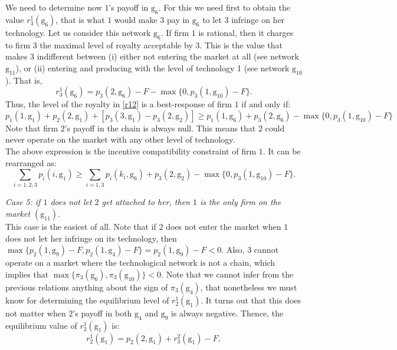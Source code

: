 \documentclass{article}
\begin{document}
We need to determine now $1$'s payoff in $\text{g}_6$. For this we need first to obtain the value $r^1_3(\text{g}_6)$, that is what $1$ would make $3$ pay in $\text{g}_6$
to let $3$ infringe on her technology. Let us consider this network $\text{g}_6$. If firm $1$ is rational, then it charges to firm $3$ the maximal level of royalty acceptable by $3$. This is the value that makes $3$ indifferent between (i) either not entering the market at all (see network $\text{g}_{11}$), or (ii) entering and producing with the level of technology 1 (see network $\text{g}_{10}$). That is, 
\begin{equation}
    r^1_3(\text{g}_6)= p_3(2,\text{g}_6)-F - \max\{0, p_3(1,\text{g}_{10})-F\}. \label{r13}
\end{equation}
Thus, the level of the royalty in \eqref{r12}
is a best-response of firm $1$ if and only if: 
\begin{equation*}
    p_1(1,\text{g}_1) +p_2(2,\text{g}_1)+ [ p_3(3,\text{g}_1)-p_3(2,\text{g}_2)] \geq p_1(1,\text{g}_6)+p_3(2,\text{g}_6) - \max\{0, p_3(1,\text{g}_{10})-F\}
\end{equation*}
Note that firm $2$'s payoff in the chain is always null. This means that $2$ could never operate on the market with any other level of technology. \\
The above expression is the incentive compatibility constraint of firm $1$. It can be rearranged as: 
\begin{equation}
    \sum_{i=1,2,3}p_i(i,\text{g}_1)\geq \sum_{i=1,3}p_i(k_i, \text{g}_6) +p_3(2,\text{g}_2)-\max\{0,p_3(1,\text{g}_{10})-F\}.
\end{equation}

\textit{Case 5: if $1$ does not let $2$ get attached to her, then $1$ is the only firm on the market $(\text{g}_{11})$.}\\
This case is the easiest of all. Note that if $2$ does not enter the market when $1$ does not let her infringe on its technology, then $\max\{p_2(1,\text{g}_9)-F,p_2(1,\text{g}_4)-F\}=p_2(1,\text{g}_9)-F<0$. Also, $3$ cannot operate on a market where the technological network is not a chain, which implies that $\max\{\pi_3(\text{g}_6),\pi_3(\text{g}_{10})\}< 0$. Note that we cannot infer from the previous relations anything about the sign of $\pi_3(\text{g}_4)$, that nonetheless we must know for determining the equilibrium level of $r^1_2(\text{g}_1)$. It turns out that this does not matter when $2$'s payoff in both $\text{g}_4$ and $\text{g}_9$ is always negative. Thence, the equilibrium value of $r^1_2(\text{g}_1)$ is: 
    \begin{equation*}
        r^1_2(\text{g}_1)= p_2(2,\text{g}_1)+r^2_3(\text{g}_1)-F,
    \end{equation*}
\end{document}
